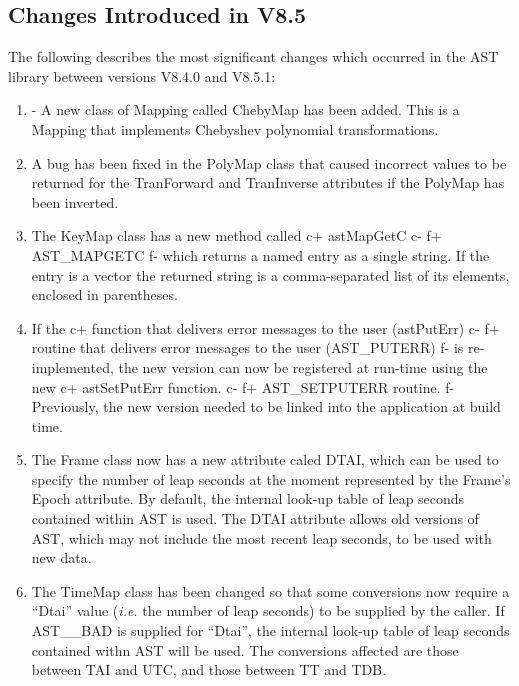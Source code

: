 \documentclass[twoside,11pt]{starlink}
\begin{document}
\subsection{Changes Introduced in V8.5}
The following describes the most significant changes which
occurred in the AST library between versions V8.4.0 and V8.5.1:

\begin{enumerate}

\item - A new class of Mapping called ChebyMap has been added. This is a
Mapping that implements Chebyshev polynomial transformations.

\item A bug has been fixed in the PolyMap class that caused incorrect values
to be returned for the TranForward and TranInverse attributes if the PolyMap
has been inverted.

\item The KeyMap class has a new method called
c+
astMapGetC
c-
f+
AST\_MAPGETC
f-
which returns a named entry as a single string. If the entry is a vector
the returned string is a comma-separated list of its elements, enclosed
in parentheses.

\item If the
c+
function that delivers error messages to the user (astPutErr)
c-
f+
routine that delivers error messages to the user (AST\_PUTERR)
f-
is re-implemented, the new version can now be registered at run-time using
the new
c+
astSetPutErr function.
c-
f+
AST\_SETPUTERR routine.
f-
Previously, the new version needed to be linked into the application at
build time.


\item The Frame class now has a new attribute caled DTAI, which can be used
to specify the number of leap seconds at the moment represented by the
Frame's Epoch attribute. By default, the internal look-up table of leap
seconds contained within AST is used. The DTAI attribute allows old
versions of AST, which may not include the most recent leap seconds, to
be used with new data.

\item The TimeMap class has been changed so that some conversions now require
a ``Dtai'' value (\emph{i.e.} the number of leap seconds) to be supplied by the
caller. If AST\_\_BAD is supplied for ``Dtai'', the internal look-up table of
leap seconds contained withn AST will be used. The conversions affected
are those between TAI and UTC, and those between TT and TDB.

\end{enumerate}
\end{document}
